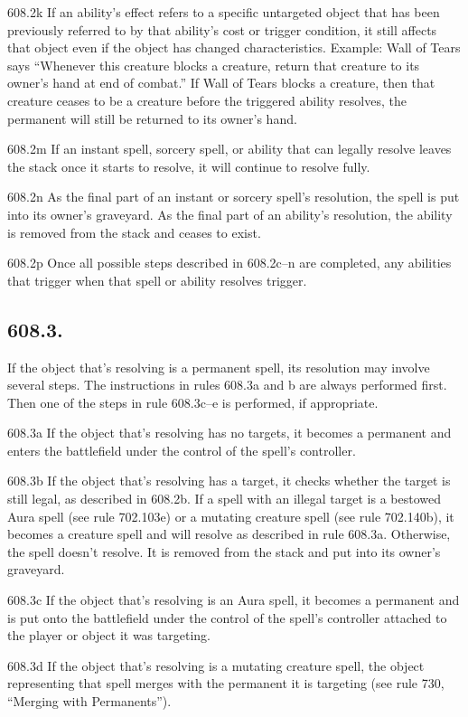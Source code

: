 608.2k If an ability’s effect refers to a specific untargeted object that has been previously referred to by that ability’s cost or trigger condition, it still affects that object even if the object has changed characteristics.
Example: Wall of Tears says “Whenever this creature blocks a creature, return that creature to its owner’s hand at end of combat.” If Wall of Tears blocks a creature, then that creature ceases to be a creature before the triggered ability resolves, the permanent will still be returned to its owner’s hand.

608.2m If an instant spell, sorcery spell, or ability that can legally resolve leaves the stack once it starts to resolve, it will continue to resolve fully.

608.2n As the final part of an instant or sorcery spell’s resolution, the spell is put into its owner’s graveyard. As the final part of an ability’s resolution, the ability is removed from the stack and ceases to exist.

608.2p Once all possible steps described in 608.2c–n are completed, any abilities that trigger when that spell or ability resolves trigger.

\subsection*{608.3.}
If the object that’s resolving is a permanent spell, its resolution may involve several steps. The instructions in rules 608.3a and b are always performed first. Then one of the steps in rule 608.3c–e is performed, if appropriate.

608.3a If the object that’s resolving has no targets, it becomes a permanent and enters the battlefield under the control of the spell’s controller.

608.3b If the object that’s resolving has a target, it checks whether the target is still legal, as described in 608.2b. If a spell with an illegal target is a bestowed Aura spell (see rule 702.103e) or a mutating creature spell (see rule 702.140b), it becomes a creature spell and will resolve as described in rule 608.3a. Otherwise, the spell doesn’t resolve. It is removed from the stack and put into its owner’s graveyard.

608.3c If the object that’s resolving is an Aura spell, it becomes a permanent and is put onto the battlefield under the control of the spell’s controller attached to the player or object it was targeting.

608.3d If the object that’s resolving is a mutating creature spell, the object representing that spell merges with the permanent it is targeting (see rule 730, “Merging with Permanents”).

